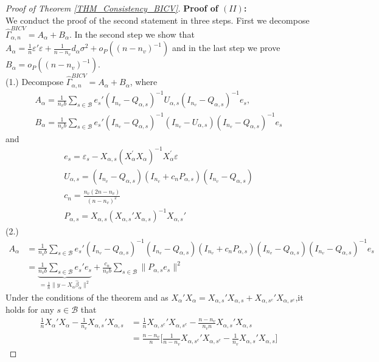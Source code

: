 \documentclass[Research_Module_ES.tex]{subfiles}
\begin{document}
\begin{proof}[Proof of Theorem \ref{THM_Consistency_BICV}]
	\textbf{Proof of $(II)$:} \\
	We conduct the proof of the second statement in three steps. First we decompose $\hat{\Gamma}_{\alpha,n}^{BICV} = A_\alpha + B_\alpha$. In the second step we show that $A_\alpha=\frac{1}{n}\varepsilon'\varepsilon + \frac{1}{n-n_v}d_\alpha\sigma^2 + o_P((n-n_v)^{-1})$ and in the last step we prove $B_\alpha = o_P((n-n_v)^{-1})$. \\
	(1.) Decompose $\hat{\Gamma}_{\alpha,n}^{BICV} = A_\alpha + B_\alpha$, where
	\begin{align*}
	A_\alpha=\frac{1}{n_vb}\sum_{s\in \mathcal{B}}e_s'(I_{n_v}-Q_{\alpha,s})^{-1}U_{\alpha,s}(I_{n_v}-Q_{\alpha,s})^{-1}e_s,\\
	B_\alpha=\frac{1}{n_vb}\sum_{s\in \mathcal{B}}e_s'(I_{n_v}-Q_{\alpha,s})^{-1}(I_{n_v}-U_{\alpha,s})(I_{n_v}-Q_{\alpha,s})^{-1}e_s
	\end{align*}
	and
	\begin{align*}
	e_s=\varepsilon_s-X_{\alpha,s}(X_\alpha^\prime X_\alpha)^{-1}X_\alpha^\prime\varepsilon\\
	U_{\alpha,s} = (I_{n_v}-Q_{\alpha,s})(I_{n_v}+c_n P_{\alpha,s})(I_{n_v}-Q_{\alpha,s})\\
	c_n = \frac{n_v(2n-n_v)}{(n-n_v)^2}\\
	P_{\alpha,s}= X_{\alpha,s}(X_{\alpha,s}'X_{\alpha,s})^{-1}X_{\alpha,s}'
	\end{align*}
	(2.)
	\begin{align*}
	A_\alpha&= \frac{1}{n_vb}\sum_{s\in \mathcal{B}}e_s'(I_{n_v}-Q_{\alpha,s})^{-1}(I_{n_v}-Q_{\alpha,s})(I_{n_v}+c_n P_{\alpha,s})(I_{n_v}-Q_{\alpha,s})(I_{n_v}-Q_{\alpha,s})^{-1}e_s\\
	&=  \underbrace{\frac{1}{n_vb}\sum_{s\in \mathcal{B}} e_s'e_s}_{=\frac{1}{n}\lVert y-X_\alpha\hat{\beta}_\alpha\rVert^2} + \frac{c_n}{n_vb}\sum_{s\in \mathcal{B}}\lVert P_{\alpha,s}e_s\rVert^2
	\end{align*}
	Under the conditions of the theorem and as $X_\alpha'X_\alpha =X_{\alpha,s}'X_{\alpha,s}+X_{\alpha,s^c}'X_{\alpha,s^c}$,it holds for any $s\in \mathcal{B}$ that
	\begin{align*}
	\frac{1}{n}X_\alpha'X_\alpha - \frac{1}{n_v}X_{\alpha,s}'X_{\alpha,s}
	&=\frac{1}{n}X_{\alpha,s^c}'X_{\alpha,s^c}-\frac{n-n_v}{n_vn}X_{\alpha,s}'X_{\alpha,s}\\
	&= \frac{n-n_v}{n}\biggl[\frac{1}{n-n_v}X_{\alpha,s^c}'X_{\alpha,s^c}-\frac{1}{n_v}X_{\alpha,s}'X_{\alpha,s}\biggr] 

\end{align*}
\end{proof}
\end{document}
